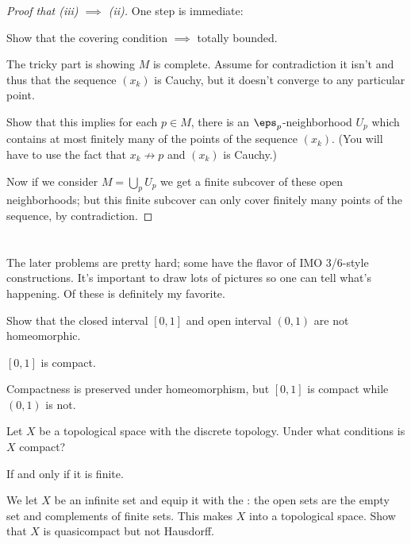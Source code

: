 \begin{proof}
	[Proof that (iii) $\implies$ (ii)]
	One step is immediate:
	\begin{ques}
		Show that the covering condition $\implies$ totally bounded.
	\end{ques}
	The tricky part is showing $M$ is complete.
	Assume for contradiction it isn't and thus that the sequence $(x_k)$ is Cauchy,
	but it doesn't converge to any particular point.
	\begin{ques}
		Show that this implies for each $p \in M$, there is an $\eps_p$-neighborhood $U_p$
		which contains at most finitely many of the points of the sequence $(x_k)$.
		(You will have to use the fact that $x_k \not\to p$ and $(x_k)$ is Cauchy.)
	\end{ques}
	Now if we consider $M = \bigcup_p U_p$ we get a
	finite subcover of these open neighborhoods;
	but this finite subcover can only cover finitely
	many points of the sequence, by contradiction.
\end{proof}


\section{\problemhead}
The later problems are pretty hard;
some have the flavor of IMO 3/6-style constructions.
It's important to draw lots of pictures so one can tell what's happening.
Of these  is definitely my favorite.

\begin{problem}
	Show that the closed interval $[0,1]$ and
	open interval $(0,1)$ are not homeomorphic.
	\begin{hint}
		$[0,1]$ is compact.
	\end{hint}
	\begin{sol}
		Compactness is preserved under homeomorphism,
		but $[0,1]$ is compact while $(0,1)$ is not.
	\end{sol}
\end{problem}

\begin{problem}
	Let $X$ be a topological space with the discrete topology.
	Under what conditions is $X$ compact?
	\begin{hint}
		If and only if it is finite.
	\end{hint}
\end{problem}

\begin{problem}
	We let $X$ be an infinite set and equip it with the
	:
	the open sets are the empty set and complements of finite sets.
	This makes $X$ into a topological space.
	Show that $X$ is quasicompact but not Hausdorff.
\end{problem}

